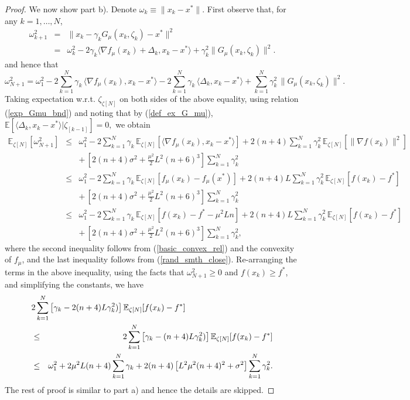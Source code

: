 \documentclass[final]{siamltex}
\newcommand{\beqa}{\begin{eqnarray}}
\newcommand{\eeqa}{\end{eqnarray}}
\newcommand{\beqas}{\begin{eqnarray*}}
\newcommand{\eeqas}{\end{eqnarray*}}
\newcommand{\nn}{\nonumber}
\def\eqnok#1{(\ref{#1})}
\newcommand{\bbe}{\mathbb{E}}
\def\w{\omega}
\begin{document}
\begin{proof}
We now show part b). Denote $\w_k \equiv \|x_k - x^*\|$.
First observe that, for any $k = 1, \ldots, N$,
\beqas
\w_{k+1}^2 &=& \|x_k - \gamma_k G_{\mu}(x_k, \zeta_k) - x^*\|^2 \\
&=& \w_k^2 - 2 \gamma_k \langle \nabla f_{\mu}(x_k) + \Delta_k, x_k - x^*\rangle
+ \gamma_k^2 \|G_{\mu}(x_k, \zeta_k)\|^2.
\eeqas
and hence that
\[
\w_{N+1}^2 =
\w_1^2 - 2 \sum_{k=1}^N \gamma_k \, \langle \nabla f_{\mu}(x_k), x_k - x^*\rangle
 - 2 \sum_{k=1}^N \gamma_k \, \langle \Delta_k, x_k - x^*\rangle +   \sum_{k=1}^N \gamma_k^2 \,
 \|G_{\mu}(x_k, \zeta_k)\|^2.
\]
Taking expectation w.r.t. $\zeta_{\zeta[N]}$ on both sides of the above equality,
using relation \eqnok{exp_Gmu_bnd} and noting that by \eqnok{def_ex_G_mu},
$
\bbe[\langle \Delta_k, x_k - x^*\rangle| \zeta_{[k-1]}] = 0,
$
we obtain
\beqa
\bbe_{\zeta[N]}[\w_{N+1}^2]
 &\le& \w_1^2 - 2 \sum_{k=1}^N \gamma_k \, \bbe_{\zeta[N]}
 [\langle \nabla f_{\mu}(x_k), x_k - x^*\rangle]  + 2(n+4) \sum_{k=1}^N \gamma_k^2 \,\bbe_{\zeta[N]}[\|\nabla f(x_k)\|^2]\nn \\
&& + \, \left[2(n+4)\sigma^2 + \frac{\mu^2}{2} L^2(n+6)^3\right] \sum_{k=1}^N \gamma_k^2 \nn \\
&\le& \w_1^2 - 2 \sum_{k=1}^N \gamma_k \, \bbe_{\zeta[N]}[f_{\mu}(x_k) - f_{\mu}(x^*)] + 2(n+4)L \sum_{k=1}^N \gamma_k^2 \, \bbe_{\zeta[N]}[f(x_k) - f^*]\nn \\
&& + \, \left[2(n+4)\sigma^2 + \frac{\mu^2}{2} L^2(n+6)^3 \right] \sum_{k=1}^N \gamma_k^2 \nn \\
&\le& \w_1^2 - 2 \sum_{k=1}^N \gamma_k \, \bbe_{\zeta[N]}\left[f(x_k) - f^* - \mu^2 L n\right] +
2(n+4)L \sum_{k=1}^N \gamma_k^2 \, \bbe_{\zeta[N]}[f(x_k) - f^*]\nn \\
&& + \, \left[2(n+4)\sigma^2 + \frac{\mu^2}{2} L^2(n+6)^3 \right] \sum_{k=1}^N \gamma_k^2,\nn
\eeqa
where the second inequality follows from \eqnok{basic_convex_rel} and
the convexity of $f_\mu$, and the last inequality follows from \eqnok{rand_smth_close}.
Re-arranging the terms in the above inequality, using the facts that $\w_{N+1}^2 \ge 0$ and
$f(x_k) \ge f^*$, and simplifying the constants, we have
\beqas
\lefteqn{2 \sum_{k=1}^N \left[\gamma_k  - 2(n+4)L\gamma_k^2)\right]
\bbe_{\zeta[N]}[f(x_k) - f^*] }\\
&\le& 2 \sum_{k=1}^N \left[\gamma_k  - (n+4)L\gamma_k^2)\right]
\bbe_{\zeta[N]}[f(x_k) - f^*]\\
&\le& \w_1^2 + 2 \mu^2 L (n+4) \sum_{k=1}^N \gamma_k  +2(n+4)
\left[L^2 \mu^2 (n+4)^2 + \sigma^2\right]\sum_{k=1}^N \gamma_k^2.
\eeqas
The rest of proof is similar to part a) and hence the details are skipped.
\end{proof}
\end{document}
